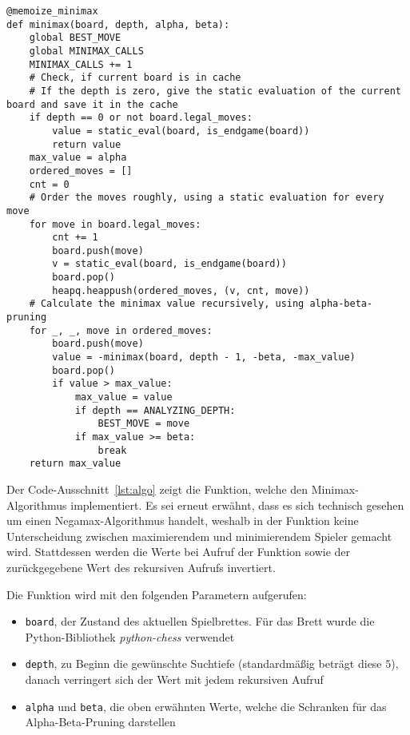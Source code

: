 \begin{lstlisting}[caption=Funktion für den Minimax-Algorithmus mit Alpha-Beta-Pruning, label=lst:algo]
@memoize_minimax
def minimax(board, depth, alpha, beta):
    global BEST_MOVE
    global MINIMAX_CALLS
    MINIMAX_CALLS += 1
    # Check, if current board is in cache
    # If the depth is zero, give the static evaluation of the current board and save it in the cache
    if depth == 0 or not board.legal_moves:
        value = static_eval(board, is_endgame(board))
        return value
    max_value = alpha
    ordered_moves = []
    cnt = 0
    # Order the moves roughly, using a static evaluation for every move
    for move in board.legal_moves:
        cnt += 1
        board.push(move)
        v = static_eval(board, is_endgame(board))
        board.pop()
        heapq.heappush(ordered_moves, (v, cnt, move))
    # Calculate the minimax value recursively, using alpha-beta-pruning
    for _, _, move in ordered_moves:
        board.push(move)
        value = -minimax(board, depth - 1, -beta, -max_value)
        board.pop()
        if value > max_value:
            max_value = value
            if depth == ANALYZING_DEPTH:
                BEST_MOVE = move
            if max_value >= beta:
                break
    return max_value
\end{lstlisting}

Der Code-Ausschnitt~\ref{lst:algo} zeigt die Funktion, welche den Minimax-Algorithmus implementiert. Es sei erneut erwähnt, dass es sich technisch gesehen um einen Negamax-Algorithmus handelt, weshalb in der Funktion keine Unterscheidung zwischen maximierendem und minimierendem Spieler gemacht wird. Stattdessen werden die Werte bei Aufruf der Funktion sowie der zurückgegebene Wert des rekursiven Aufrufs invertiert.

Die Funktion wird mit den folgenden Parametern aufgerufen:

\begin{itemize}
    \item \texttt{board}, der Zustand des aktuellen Spielbrettes. Für das Brett wurde die Python-Bibliothek \textit{python-chess} verwendet
    \item \texttt{depth}, zu Beginn die gewünschte Suchtiefe (standardmäßig beträgt diese $5$), danach verringert sich der Wert mit jedem rekursiven Aufruf
    \item \texttt{alpha} und \texttt{beta}, die oben erwähnten Werte, welche die Schranken für das Alpha-Beta-Pruning darstellen
\end{itemize}

